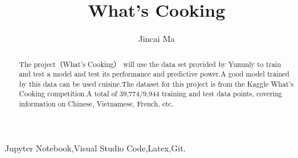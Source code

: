 \documentclass{amsart}
\begin{document}
%
%
\title[A Short Running Title]{ What's Cooking}%

\author{Jincai Ma}



%
%
\date{\gitAuthorDate}%

\begin{abstract}
    The project（What's Cooking） will use the data set provided by Yummly to train and test a model and test its performance and predictive power.A good model trained by this data can be used  cuisine.The dataset for this project is from the Kaggle What's Cooking competition.A total of 39,774/9,944 training and test data points, covering information on Chinese, Vietnamese, French, etc.
    
\end{abstract}

\maketitle
\tableofcontents

\newpage



\newpage




\listoftodos
Jupyter Notebook,Visual Studio Code,Latex,Git.
\end{document}
